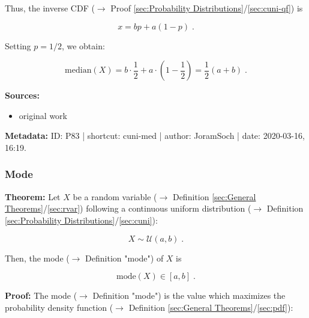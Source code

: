\documentclass[a4paper,12pt,twoside]{book}
\begin{document}
Thus, the inverse CDF ($\rightarrow$ Proof \ref{sec:Probability Distributions}/\ref{sec:cuni-qf}) is

\begin{equation} \label{eq:cuni-med-cuni-cdf-inv}
x = bp + a(1-p) \; .
\end{equation}

Setting $p = 1/2$, we obtain:

\begin{equation} \label{eq:cuni-med-cuni-med-qed}
\mathrm{median}(X) = b \cdot \frac{1}{2} + a \cdot \left( 1-\frac{1}{2} \right) = \frac{1}{2} (a+b) \; .
\end{equation}


\vspace{1em}
\textbf{Sources:}
\begin{itemize}
\item original work\end{itemize}


\vspace{1em}
\textbf{Metadata:} ID: P83 | shortcut: cuni-med | author: JoramSoch | date: 2020-03-16, 16:19.
\vspace{1em}



\subsubsection[\textbf{Mode}]{Mode} \label{sec:cuni-med}
\setcounter{equation}{0}

\textbf{Theorem:} Let $X$ be a random variable ($\rightarrow$ Definition \ref{sec:General Theorems}/\ref{sec:rvar}) following a continuous uniform distribution ($\rightarrow$ Definition \ref{sec:Probability Distributions}/\ref{sec:cuni}):

\begin{equation} \label{eq:cuni-med-cuni}
X \sim \mathcal{U}(a, b) \; .
\end{equation}

Then, the mode ($\rightarrow$ Definition "mode") of $X$ is

\begin{equation} \label{eq:cuni-med-cuni-mode}
\mathrm{mode}(X) \in [a,b] \; .
\end{equation}


\vspace{1em}
\textbf{Proof:}  The mode ($\rightarrow$ Definition "mode") is the value which maximizes the probability density function ($\rightarrow$ Definition \ref{sec:General Theorems}/\ref{sec:pdf}):
\end{document}
